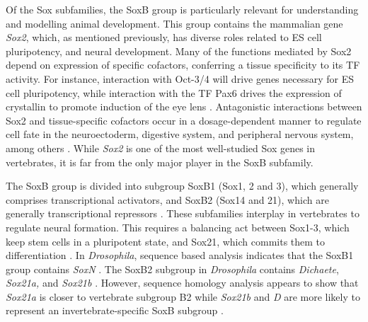 \documentclass[withindex,glossary]{cam-thesis}
\begin{document}
Of the Sox subfamilies, the SoxB group is particularly relevant for
understanding and modelling animal development. This group contains the
mammalian gene \emph{Sox2}, which, as mentioned previously, has diverse
roles related to ES cell pluripotency, and neural development. Many of
the functions mediated by Sox2 depend on expression of specific
cofactors, conferring a tissue specificity to its TF activity. For
instance, interaction with Oct-3/4 will drive genes necessary for ES
cell pluripotency, while interaction with the TF Pax6 drives the
expression of crystallin to promote induction of the eye lens .
Antagonistic interactions between Sox2 and tissue-specific cofactors
occur in a dosage-dependent manner to regulate cell fate in the
neuroectoderm, digestive system, and peripheral nervous system, among
others . While \emph{Sox2} is one of the
most well-studied Sox genes in vertebrates, it is far from the only
major player in the SoxB subfamily.

The SoxB group is divided into subgroup SoxB1 (Sox1, 2 and 3), which
generally comprises transcriptional activators, and SoxB2 (Sox14 and
21), which are generally transcriptional repressors . These subfamilies interplay in vertebrates to regulate neural
formation. This requires a balancing act between Sox1-3, which keep stem
cells in a pluripotent state, and Sox21, which commits them to
differentiation . In
\emph{Drosophila}, sequence based analysis indicates that the SoxB1
group contains \emph{SoxN} . The SoxB2 subgroup in \emph{Drosophila} contains
\emph{Dichaete}, \emph{Sox21a,} and \emph{Sox21b} .
However, sequence homology analysis appears to show that \emph{Sox21a}
is closer to vertebrate subgroup B2 while \emph{Sox21b} and \emph{D} are
more likely to represent an invertebrate-specific SoxB subgroup
.
\end{document}

